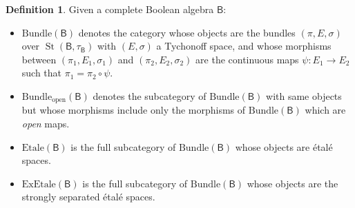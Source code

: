\documentclass[11pt]{amsart}
\newcommand{\bundle}{\textrm{Bundle}}
\newcommand{\exbundle}{\textrm{ExBundle}}
\newcommand{\bundleopen}{\textrm{Bundle}_{\textrm{open}}}
\newcommand{\exetale}{\textrm{ExEtale}}
\newcommand{\etale}{\textrm{Etale}}
\theoremstyle{plain}
\theoremstyle{definition}
\newtheorem{definition}[theorem]{Definition}
\theoremstyle{plain}
\theoremstyle{remark}
\DeclareMathOperator{\St}{St}
\newcommand{\bool}[1]{\mathsf{#1}}
\newcommand{\0}{\mathsf{0}}
\renewcommand{\1}{\mathsf{1}}
\renewcommand{\2}{\mathsf{2}}
\theoremstyle{definition}
\begin{document}
\begin{definition}
Given  a complete Boolean algebra $\bool{B}$:

\begin{itemize}
\item
$\bundle(\bool{B})$ denotes the category whose objects are the bundles $(\pi,E,\sigma)$ over $\St(\bool{B},\tau_{\bool{B}})$ with $(E,\sigma)$ a Tychonoff space, and whose morphisms between $(\pi_1, E_1, \sigma_1)$ and $(\pi_2, E_2, \sigma_2)$ are the continuous maps $\psi:E_1\to E_2$ such that $\pi_1=\pi_2\circ\psi$.
\item 
$\bundleopen(\bool{B})$ denotes the subcategory of $\bundle(\bool{B})$ with same objects but whose morphisms include only the morphisms of $\bundle(\bool{B})$ which are \emph{open} maps.
\item
$\etale(\bool{B})$ is the full subcategory of $\bundle(\bool{B})$ whose objects are \'etal\'e spaces.
% 
\item
$\exetale(\bool{B})$ is the full subcategory of $\bundle(\bool{B})$ whose objects are the strongly separated \'etal\'e spaces. 
\end{itemize}
\end{definition}
\end{document}
